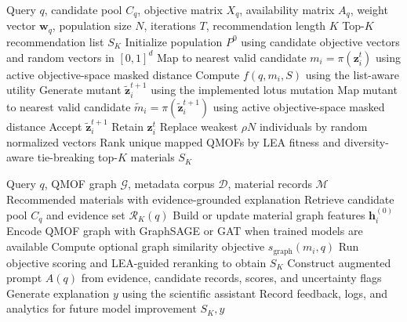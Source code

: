 \documentclass[12pt,a4paper]{article}
\begin{document}
\begin{algorithm}[H]
\caption{LEA-guided multi-objective reranking for QMOF-Rec}
\begin{algorithmic}[1]
\Require Query $q$, candidate pool $C_q$, objective matrix $X_q$, availability matrix $A_q$, weight vector $\mathbf{w}_q$, population size $N$, iterations $T$, recommendation length $K$
\Ensure Top-$K$ recommendation list $S_K$
\State Initialize population $P^0$ using candidate objective vectors and random vectors in $[0,1]^d$
    \State Map to nearest valid candidate $m_i = \pi(\mathbf{z}_i^t)$ using active objective-space masked distance
    \State Compute $f(q, m_i, S)$ using the list-aware utility
    \State Generate mutant $\tilde{\mathbf{z}}_i^{t+1}$ using the implemented lotus mutation
    \State Map mutant to nearest valid candidate $\tilde{m}_i = \pi(\tilde{\mathbf{z}}_i^{t+1})$ using active objective-space masked distance
      \State Accept $\tilde{\mathbf{z}}_i^{t+1}$
    \Else
      \State Retain $\mathbf{z}_i^t$
    \EndIf
  \EndFor
    \State Replace weakest $\rho N$ individuals by random normalized vectors
  \EndIf
\EndFor
\State Rank unique mapped QMOFs by LEA fitness and diversity-aware tie-breaking
\State \Return top-$K$ materials $S_K$
\end{algorithmic}
\end{algorithm}

\begin{algorithm}[H]
\caption{Graph-aware candidate-conditioned recommendation workflow}
\begin{algorithmic}[1]
\Require Query $q$, QMOF graph $\mathcal{G}$, metadata corpus $\mathcal{D}$, material records $\mathcal{M}$
\Ensure Recommended materials with evidence-grounded explanation
\State Retrieve candidate pool $C_q$ and evidence set $\mathcal{R}_K(q)$
\State Build or update material graph features $\mathbf{h}_i^{(0)}$
\State Encode QMOF graph with GraphSAGE or GAT when trained models are available
\State Compute optional graph similarity objective $s_{\mathrm{graph}}(m_i, q)$
\State Run objective scoring and LEA-guided reranking to obtain $S_K$
\State Construct augmented prompt $A(q)$ from evidence, candidate records, scores, and uncertainty flags
\State Generate explanation $y$ using the scientific assistant
\State Record feedback, logs, and analytics for future model improvement
\State \Return $S_K, y$
\end{algorithmic}
\end{algorithm}
\end{document}
